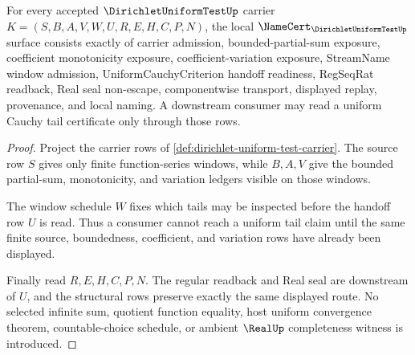 \begin{theorem}
\label{thm:dirichlet-uniform-test-namecert-obligations}
For every accepted $\DirichletUniformTestUp$ carrier $K=(S,B,A,V,W,U,R,E,H,C,P,N)$, the local $\NameCert_{\DirichletUniformTestUp}$ surface consists exactly of carrier admission, bounded-partial-sum exposure, coefficient monotonicity exposure, coefficient-variation exposure, StreamName window admission, UniformCauchyCriterion handoff readiness, RegSeqRat readback, Real seal non-escape, componentwise transport, displayed replay, provenance, and local naming. A downstream consumer may read a uniform Cauchy tail certificate only through those rows.
\end{theorem}
\begin{proof}
Project the carrier rows of \autoref{def:dirichlet-uniform-test-carrier}. The source row $S$ gives only finite function-series windows, while $B,A,V$ give the bounded partial-sum, monotonicity, and variation ledgers visible on those windows.

The window schedule $W$ fixes which tails may be inspected before the handoff row $U$ is read. Thus a consumer cannot reach a uniform tail claim until the same finite source, boundedness, coefficient, and variation rows have already been displayed.

Finally read $R,E,H,C,P,N$. The regular readback and Real seal are downstream of $U$, and the structural rows preserve exactly the same displayed route. No selected infinite sum, quotient function equality, host uniform convergence theorem, countable-choice schedule, or ambient $\RealUp$ completeness witness is introduced.
\end{proof}

